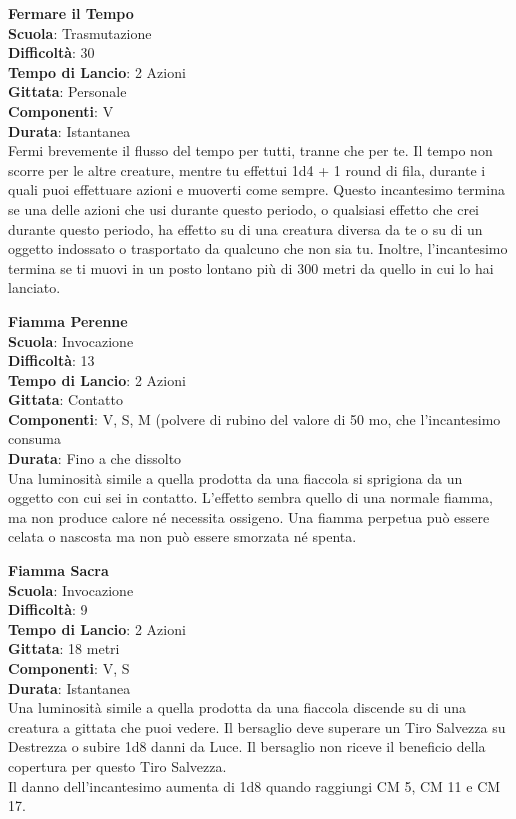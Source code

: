 \begin{multicols}{2}
\medskip\textbf{Fermare il Tempo}\\
\textbf{Scuola}: Trasmutazione\\
\textbf{Difficoltà}:  30\\
\textbf{Tempo di Lancio}: 2 Azioni\\
\textbf{Gittata}: Personale\\
\textbf{Componenti}: V\\
\textbf{Durata}: Istantanea\\
Fermi brevemente il flusso del tempo per tutti, tranne che per te. Il tempo non scorre per le altre creature,  mentre tu effettui 1d4 + 1 round  di fila, durante i quali puoi effettuare azioni e muoverti come sempre. Questo incantesimo termina se una delle azioni che usi durante questo periodo, o qualsiasi effetto che crei durante questo periodo, ha effetto su di una creatura diversa da te o su di un oggetto indossato o trasportato da qualcuno che non sia tu. Inoltre, l'incantesimo termina se ti muovi in un posto lontano più di 300 metri da quello in cui lo hai lanciato.

\medskip\textbf{Fiamma Perenne}\\
\textbf{Scuola}: Invocazione\\
\textbf{Difficoltà}:  13\\
\textbf{Tempo di Lancio}: 2 Azioni\\
\textbf{Gittata}: Contatto\\
\textbf{Componenti}: V, S, M (polvere di rubino del valore di 50 mo, che l'incantesimo consuma\\ \textbf{Durata}: Fino a che dissolto\\
Una luminosità simile a quella prodotta da una fiaccola si sprigiona da un oggetto con cui sei in contatto. L’effetto sembra quello di una normale fiamma, ma non produce calore né necessita ossigeno. Una fiamma perpetua può essere celata o nascosta ma non può essere smorzata né spenta.

\medskip\textbf{Fiamma Sacra}\\
\textbf{Scuola}: Invocazione\\
\textbf{Difficoltà}:  9\\
\textbf{Tempo di Lancio}: 2 Azioni\\
\textbf{Gittata}: 18 metri\\
\textbf{Componenti}: V, S\\
\textbf{Durata}: Istantanea\\
Una luminosità simile a quella prodotta da una fiaccola discende su di una creatura a gittata che puoi vedere. Il bersaglio deve superare un Tiro Salvezza su Destrezza o subire 1d8 danni da Luce. Il bersaglio non riceve il beneficio della copertura per questo Tiro Salvezza.\\
Il danno dell'incantesimo aumenta di 1d8 quando raggiungi CM 5, CM 11 e CM 17.


\end{multicols}
